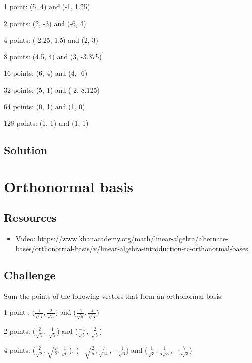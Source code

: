 1 point: (5, 4) and (-1, 1.25)

2 points:  (2, -3) and (-6, 4)

4 points: (-2.25, 1.5) and (2, 3)

8 points: (4.5, 4) and (3, -3.375)

16 points: (6, 4) and (4, -6)

32 points: (5, 1) and (-2, 8.125)

64 points: (0, 1) and (1, 0)

128 points: (1, 1) and (1, 1)

\subsection*{Solution}




\newpage
\section{Orthonormal basis}

\subsection*{Resources}
\begin{itemize}
    \item Video: \url{https://www.khanacademy.org/math/linear-algebra/alternate-bases/orthonormal-basis/v/linear-algebra-introduction-to-orthonormal-bases}
\end{itemize}

\subsection*{Challenge}
Sum the points of the following vectors that form an orthonormal basis:

1 point :
($\displaystyle \frac{1}{\sqrt{5}}, \frac{2}{\sqrt{5}}$) and
($\displaystyle \frac{2}{\sqrt{5}}, \frac{4}{\sqrt{5}}$)

2 points:
($\displaystyle \frac{2}{\sqrt{5}}$, $\displaystyle \frac{1}{\sqrt{5}}$) and
($\displaystyle \frac{-1}{\sqrt{5}}$, $\displaystyle \frac{2}{\sqrt{5}}$)

4 points:
($\displaystyle \frac{2}{\sqrt{2}}, \sqrt{\frac{7}{8}}, \frac{1}{\sqrt{6}}$),
($\displaystyle -\sqrt{\frac{2}{5}}, \frac{7}{\sqrt{14}}, -\frac{1}{\sqrt{6}}$) and
($\displaystyle \frac{1}{\sqrt{3}},  \frac{1}{5 \sqrt{3}}, -\frac{7}{5 \sqrt{3}}$)

